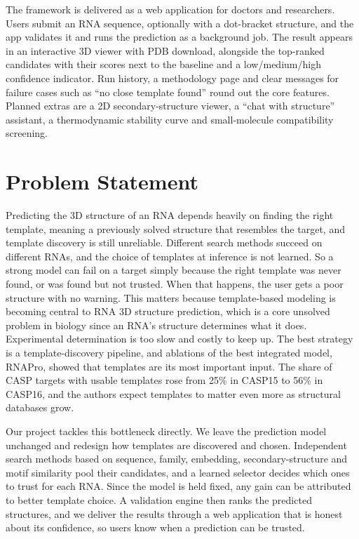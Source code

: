 \documentclass{FastFyp}
\begin{document}
The framework is delivered as a web application for doctors and researchers. Users submit an RNA sequence, optionally with a dot-bracket structure, and the app validates it and runs the prediction as a background job. The result appears in an interactive 3D viewer with PDB download, alongside the top-ranked candidates with their scores next to the baseline and a low/medium/high confidence indicator. Run history, a methodology page and clear messages for failure cases such as ``no close template found'' round out the core features. Planned extras are a 2D secondary-structure viewer, a ``chat with structure'' assistant, a thermodynamic stability curve and small-molecule compatibility screening.

\section{Problem Statement}
Predicting the 3D structure of an RNA depends heavily on finding the right template, meaning a previously solved structure that resembles the target, and template discovery is still unreliable. Different search methods succeed on different RNAs, and the choice of templates at inference is not learned. So a strong model can fail on a target simply because the right template was never found, or was found but not trusted. When that happens, the user gets a poor structure with no warning. This matters because template-based modeling is becoming central to RNA 3D structure prediction, which is a core unsolved problem in biology since an RNA's structure determines what it does. Experimental determination is too slow and costly to keep up. The best strategy is a template-discovery pipeline, and ablations of the best integrated model, RNAPro, showed that templates are its most important input. The share of CASP targets with usable templates rose from 25\% in CASP15 to 56\% in CASP16, and the authors expect templates to matter even more as structural databases grow.

Our project tackles this bottleneck directly. We leave the prediction model unchanged and redesign how templates are discovered and chosen. Independent search methods based on sequence, family, embedding, secondary-structure and motif similarity pool their candidates, and a learned selector decides which ones to trust for each RNA. Since the model is held fixed, any gain can be attributed to better template choice. A validation engine then ranks the predicted structures, and we deliver the results through a web application that is honest about its confidence, so users know when a prediction can be trusted.
\end{document}
